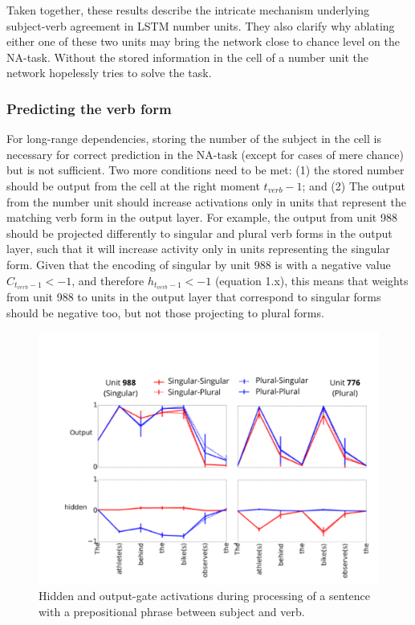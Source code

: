 Taken together, these results describe the intricate mechanism underlying subject-verb agreement in LSTM number units. 
They also clarify why ablating either one of these two units may bring the network close to chance level on the NA-task. 
Without the stored information in the cell of a number unit the network hopelessly tries to solve the task.



\subsubsection{Predicting the verb form}
For long-range dependencies, storing the number of the subject in the cell is necessary for correct prediction in the NA-task (except for cases of mere chance) but is not sufficient. 
Two more conditions need to be met: (1) the stored number should be output from the cell at the right moment $t_{verb}-1$; and (2) The output from the number unit should increase activations only in units that represent the matching verb form in the output layer. 
For example, the output from unit 988 should be projected differently to singular and plural verb forms in the output layer, such that it will increase activity only in units representing the singular form. 
Given that the encoding of singular by unit 988 is with a negative value $C_{t_{verb}-1}<-1$, and therefore $h_{t_{verb}-1}<-1$ (equation 1.x), this means that weights from unit 988 to units in the output layer that correspond to singular forms should be negative too, but not those projecting to plural forms.


\begin{figure}[ht]
\includegraphics[width=\textwidth]{Figures/Figure3_number_units_775_987_output_hidden.png}
\caption{Hidden and output-gate activations during processing of a sentence with a prepositional phrase between subject and verb. }
\end{figure}

